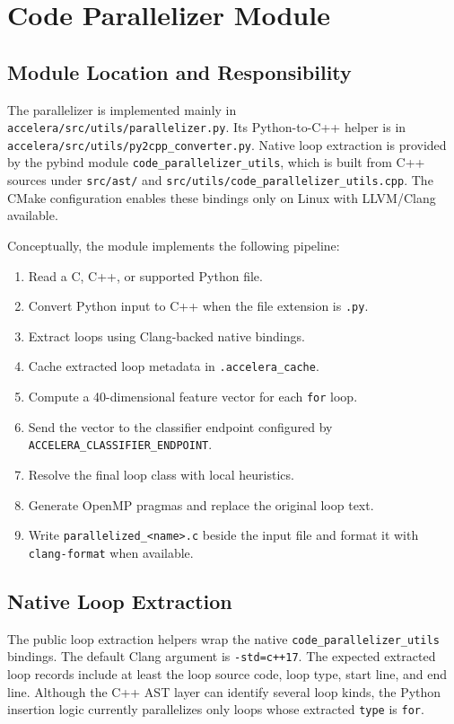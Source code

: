 \documentclass[11pt,a4paper]{article}
\newcommand{\modulepath}[1]{\texttt{#1}}
\begin{document}
\section{Code Parallelizer Module}

\subsection{Module Location and Responsibility}

The parallelizer is implemented mainly in
\modulepath{accelera/src/utils/parallelizer.py}. Its Python-to-C++ helper is in
\modulepath{accelera/src/utils/py2cpp\_converter.py}. Native loop extraction is
provided by the pybind module \modulepath{code\_parallelizer\_utils}, which is
built from C++ sources under \modulepath{src/ast/} and
\modulepath{src/utils/code\_parallelizer\_utils.cpp}. The CMake configuration
enables these bindings only on Linux with LLVM/Clang available.

Conceptually, the module implements the following pipeline:

\begin{enumerate}[leftmargin=*]
  \item Read a C, C++, or supported Python file.
  \item Convert Python input to C++ when the file extension is \texttt{.py}.
  \item Extract loops using Clang-backed native bindings.
  \item Cache extracted loop metadata in \modulepath{.accelera\_cache}.
  \item Compute a 40-dimensional feature vector for each \texttt{for} loop.
  \item Send the vector to the classifier endpoint configured by
        \texttt{ACCELERA\_CLASSIFIER\_ENDPOINT}.
  \item Resolve the final loop class with local heuristics.
  \item Generate OpenMP pragmas and replace the original loop text.
  \item Write \texttt{parallelized\_<name>.c} beside the input file and format
        it with \texttt{clang-format} when available.
\end{enumerate}

\subsection{Native Loop Extraction}

The public loop extraction helpers wrap the native
\texttt{code\_parallelizer\_utils} bindings. The default Clang argument is
\texttt{-std=c++17}. The expected extracted loop records include at least the
loop source code, loop type, start line, and end line. Although the C++ AST
layer can identify several loop kinds, the Python insertion logic currently
parallelizes only loops whose extracted \texttt{type} is \texttt{for}.
\end{document}
